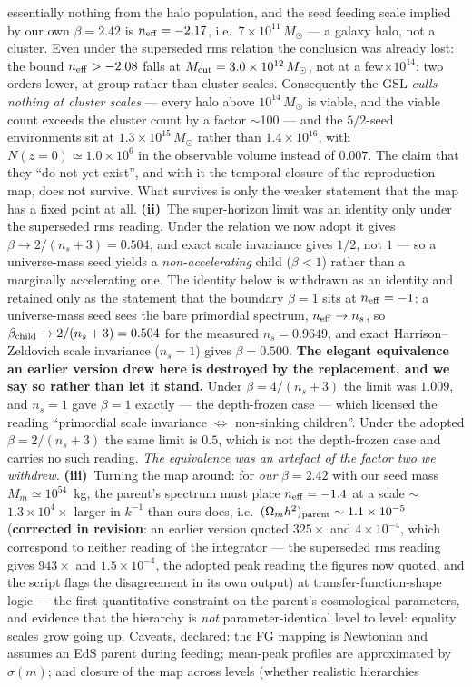 \documentclass[11pt]{article}
\begin{document}
essentially nothing from the halo population, and the seed feeding scale implied by our own $\beta = 2.42$ is $n_{\rm eff} = -2.17$, i.e.\ $7\times10^{11}\,M_\odot$ --- a galaxy halo, not a cluster. Even under the superseded rms relation the conclusion was already lost: the bound $n_{\rm eff} > -2.08$ falls at $M_{\rm cut} = 3.0\times10^{12}\,M_\odot$, not at a few$\times10^{14}$: two orders lower, at group rather than cluster scales. Consequently the GSL \emph{culls nothing at cluster scales} --- every halo above $10^{14}\,M_\odot$ is viable, and the viable count exceeds the cluster count by a factor $\sim$100 --- and the $5/2$-seed environments sit at $1.3\times10^{15}\,M_\odot$ rather than $1.4\times10^{16}$, with $N(z=0) \simeq 1.0\times10^{6}$ in the observable volume instead of $0.007$. The claim that they ``do not yet exist'', and with it the temporal closure of the reproduction map, does not survive. What survives is only the weaker statement that the map has a fixed point at all. \textbf{(ii)}~The super-horizon limit was an identity only under the superseded rms reading. Under the relation we now adopt it gives $\beta \to 2/(n_s+3) = 0.504$, and exact scale invariance gives $1/2$, not $1$ --- so a universe-mass seed yields a \emph{non-accelerating} child ($\beta < 1$) rather than a marginally accelerating one. The identity below is withdrawn as an identity and retained only as the statement that the boundary $\beta = 1$ sits at $n_{\rm eff} = -1$: a universe-mass seed sees the bare primordial spectrum, $n_{\rm eff} \to n_s$, so $\beta_{\rm child} \to 2/(n_s+3) = 0.504$ for the measured $n_s = 0.9649$, and exact Harrison--Zeldovich scale invariance ($n_s = 1$) gives $\beta = 0.500$. \textbf{The elegant equivalence an earlier version drew here is destroyed by the replacement, and we say so rather than let it stand.} Under $\beta = 4/(n_s+3)$ the limit was $1.009$, and $n_s = 1$ gave $\beta = 1$ exactly --- the depth-frozen case --- which licensed the reading ``primordial scale invariance $\Leftrightarrow$ non-sinking children''. Under the adopted $\beta = 2/(n_s+3)$ the same limit is $0.5$, which is not the depth-frozen case and carries no such reading. \emph{The equivalence was an artefact of the factor two we withdrew.} \textbf{(iii)}~Turning the map around: for \emph{our} $\beta = 2.42$ with our seed mass $M_m \simeq 10^{54}$~kg, the parent's spectrum must place $n_{\rm eff} = -1.4$ at a scale $\sim$$1.3\times10^{4}\times$ larger in $k^{-1}$ than ours does, i.e.\ $(\Omega_m h^2)_{\rm parent} \sim 1.1\times10^{-5}$ (\textbf{corrected in revision}: an earlier version quoted $325\times$ and $4\times10^{-4}$, which correspond to neither reading of the integrator --- the superseded rms reading gives $943\times$ and $1.5\times10^{-4}$, the adopted peak reading the figures now quoted, and the script flags the disagreement in its own output) at transfer-function-shape logic --- the first quantitative constraint on the parent's cosmological parameters, and evidence that the hierarchy is \emph{not} parameter-identical level to level: equality scales grow going up. Caveats, declared: the FG mapping is Newtonian and assumes an EdS parent during feeding; mean-peak profiles are approximated by $\sigma(m)$; and closure of the map across levels (whether realistic hierarchies 
\end{document}
